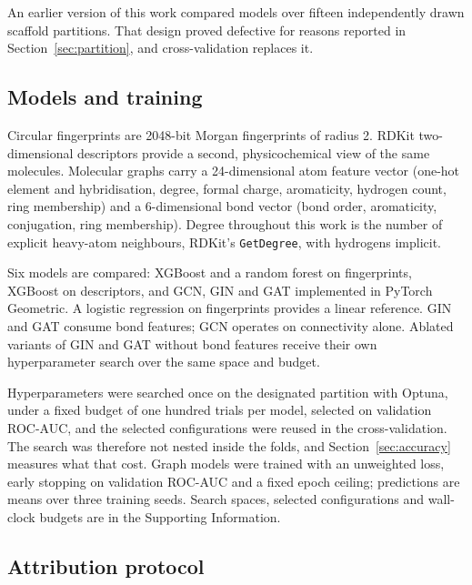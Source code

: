 \documentclass[journal=jcisd8,manuscript=article]{achemso}
\begin{document}
An earlier version of this work compared models over fifteen independently drawn scaffold
partitions. That design proved defective for reasons reported in
Section~\ref{sec:partition}, and cross-validation replaces it.

\subsection{Models and training}

Circular fingerprints are 2048-bit Morgan fingerprints of radius 2.\cite{rogers2010} RDKit
two-dimensional descriptors provide a second, physicochemical view of the same molecules.
Molecular graphs carry a 24-dimensional atom feature vector (one-hot element and
hybridisation, degree, formal charge, aromaticity, hydrogen count, ring membership) and a
6-dimensional bond vector (bond order, aromaticity, conjugation, ring membership). Degree
throughout this work is the number of explicit heavy-atom neighbours, RDKit's
\texttt{GetDegree}, with hydrogens implicit.

Six models are compared: XGBoost\cite{chen2016} and a random forest on fingerprints, XGBoost
on descriptors, and GCN,\cite{kipf2017} GIN\cite{xu2019} and GAT\cite{velickovic2018}
implemented in PyTorch Geometric.\cite{fey2019} A logistic regression on fingerprints
provides a linear reference. GIN and GAT consume bond features; GCN operates on connectivity
alone. Ablated variants of GIN and GAT without bond features receive their own hyperparameter
search over the same space and budget.


Hyperparameters were searched once on the designated partition with Optuna,\cite{akiba2019}
under a fixed budget of one hundred trials per model, selected on validation ROC-AUC, and the selected configurations were
reused in the cross-validation. The search was therefore not nested inside the folds, and
Section~\ref{sec:accuracy} measures what that cost. Graph models were trained with an
unweighted loss, early stopping on validation ROC-AUC and a fixed epoch ceiling; predictions
are means over three training seeds. Search spaces, selected configurations and wall-clock
budgets are in the Supporting Information.

\subsection{Attribution protocol}
\end{document}
